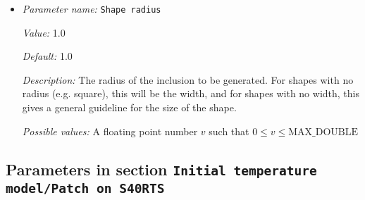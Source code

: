 \begin{itemize}
{\it Description:} The temperature of the inclusion shape. This is only the true temperature in the case of the constant gradient. In all other cases, it gives one endpoint of the temperature gradient for the shape.


{\it Possible values:} A floating point number $v$ such that $-\text{MAX\_DOUBLE} \leq v \leq \text{MAX\_DOUBLE}$
\item {\it Parameter name:} {\tt Shape radius}
\label{parameters:Initial temperature model/Inclusion shape perturbation/Shape radius}
\label{parameters:Initial_20temperature_20model/Inclusion_20shape_20perturbation/Shape_20radius}


{\it Value:} 1.0


{\it Default:} 1.0


{\it Description:} The radius of the inclusion to be generated. For shapes with no radius (e.g. square), this will be the width, and for shapes with no width, this gives a general guideline for the size of the shape.


{\it Possible values:} A floating point number $v$ such that $0 \leq v \leq \text{MAX\_DOUBLE}$
\end{itemize}

\subsection{Parameters in section \tt Initial temperature model/Patch on S40RTS}
\label{parameters:Initial_20temperature_20model/Patch_20on_20S40RTS}

